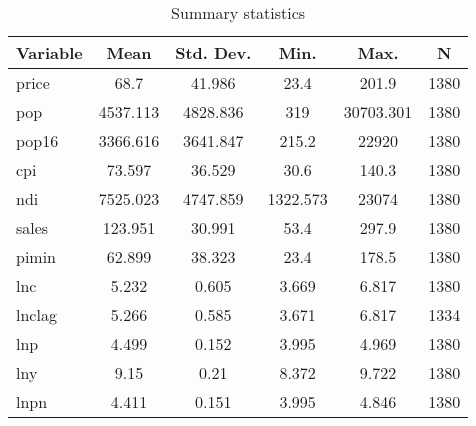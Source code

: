 
\begin{table}[htbp]\centering \caption{Summary statistics \label{sumstat}}
\begin{tabular}{l c c c c c}\hline\hline
\multicolumn{1}{c}{\textbf{Variable}} & \textbf{Mean}
 & \textbf{Std. Dev.}& \textbf{Min.} &  \textbf{Max.} & \textbf{N}\\ \hline
price & 68.7 & 41.986 & 23.4 & 201.9 & 1380\\
pop & 4537.113 & 4828.836 & 319 & 30703.301 & 1380\\
pop16 & 3366.616 & 3641.847 & 215.2 & 22920 & 1380\\
cpi & 73.597 & 36.529 & 30.6 & 140.3 & 1380\\
ndi & 7525.023 & 4747.859 & 1322.573 & 23074 & 1380\\
sales & 123.951 & 30.991 & 53.4 & 297.9 & 1380\\
pimin & 62.899 & 38.323 & 23.4 & 178.5 & 1380\\
lnc & 5.232 & 0.605 & 3.669 & 6.817 & 1380\\
lnclag & 5.266 & 0.585 & 3.671 & 6.817 & 1334\\
lnp & 4.499 & 0.152 & 3.995 & 4.969 & 1380\\
lny & 9.15 & 0.21 & 8.372 & 9.722 & 1380\\
lnpn & 4.411 & 0.151 & 3.995 & 4.846 & 1380\\
\hline\end{tabular}
\end{table}
